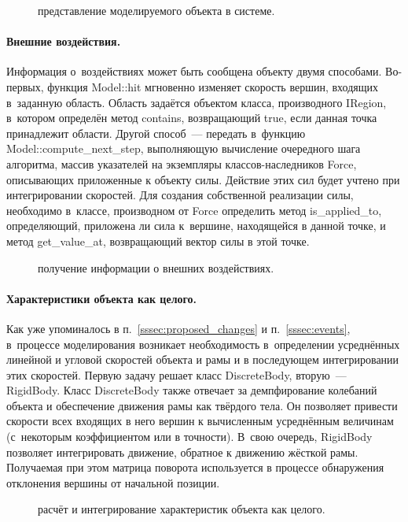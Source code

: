 \documentclass[a4paper, 14pt, titlepage]{extarticle}
\newcommand{\includefigure}[3][]{
    \begin{figure}[!htb]
      \center{\texttt{[image: \#2]}}
      \caption{#3} \label{fig:#2}
    \end{figure}
  }
\begin{document}
        \includefigure{core-vertices}{представление моделируемого объекта в системе.}

        \paragraph{Внешние воздействия.}
        Информация о~воздействиях может быть сообщена объекту двумя способами. Во-первых,
        функция Model::hit мгновенно изменяет скорость вершин, входящих в~заданную область. Область
        задаётся объектом класса, производного IRegion, в~котором определён метод contains,
        возвращающий true, если данная точка принадлежит области. Другой способ~--- передать в~функцию
        Model::compute\_next\_step, выполняющую вычисление очередного шага алгоритма, массив указателей
        на экземпляры классов-наследников Force, описывающих приложенные к объекту силы. Действие этих
        сил будет учтено при интегрировании скоростей. Для создания собственной реализации силы,
        необходимо в~классе, производном от Force определить метод is\_applied\_to, определяющий,
        приложена ли сила к~вершине, находящейся в данной точке, и метод get\_value\_at,
        возвращающий вектор силы в этой точке.

        \includefigure{core-interaction}{получение информации о внешних воздействиях.}

        \paragraph{Характеристики объекта как целого.}
        Как уже упоминалось в п.~\ref{sssec:proposed_changes} и п.~\ref{sssec:events}, в~процессе
        моделирования возникает необходимость в~определении усреднённых линейной и угловой скоростей
        объекта и рамы и в последующем интегрировании этих скоростей. Первую задачу решает класс
        DiscreteBody, вторую~--- RigidBody. Класс DiscreteBody также отвечает за демпфирование колебаний
        объекта и обеспечение движения рамы как твёрдого тела. Он позволяет привести скорости всех
        входящих в него вершин к вычисленным усреднённым величинам (с~некоторым коэффициентом или в
        точности). В~свою очередь, RigidBody позволяет интегрировать движение, обратное
        к движению жёсткой рамы. Получаемая при этом матрица поворота используется в процессе
        обнаружения отклонения вершины от начальной позиции.

        \includefigure{core-bodies}{расчёт и интегрирование характеристик объекта как целого.}
\end{document}

